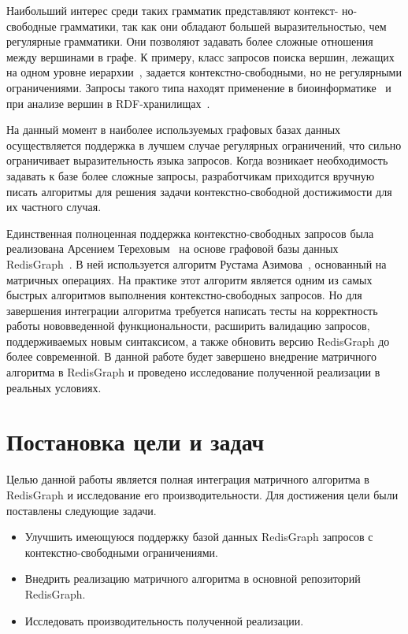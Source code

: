 \documentclass[14pt]{matmex-diploma-custom}
\begin{document}
Наибольший интерес среди таких грамматик представляют контекст-
но-свободные грамматики, так как они обладают большей выразительностью, чем регулярные грамматики. Они позволяют задавать более сложные отношения между вершинами в графе. К примеру, класс
запросов поиска вершин, лежащих на одном уровне иерархии~\cite{zhang2016contextfree}, задается
контекстно-свободными, но не регулярными ограничениями. Запросы такого типа находят
применение в биоинформатике~\cite{bioinf} и при анализе вершин в RDF-хранилищах~\cite{zhang2016contextfree}.

На данный момент в наиболее используемых графовых базах данных осуществляется
поддержка в лучшем случае регулярных ограничений, что сильно ограничивает
выразительность языка запросов. Когда возникает необходимость задавать к базе более сложные запросы, разработчикам приходится вручную писать алгоритмы для решения задачи контекстно-свободной достижимости для их частного случая.

Единственная полноценная поддержка контекстно-свободных запросов была реализована Арсением Тереховым~\cite{Arseniy-diploma} на основе графовой базы данных RedisGraph~\cite{RedisGraph}. В ней используется алгоритм Рустама Азимова~\cite{azimov-algo}, основанный на матричных операциях. На практике этот алгоритм является одним из самых быстрых алгоритмов выполнения контекстно-свободных запросов. Но для завершения интеграции алгоритма требуется написать тесты на корректность работы нововведенной функциональности, расширить валидацию запросов, поддерживаемых новым синтаксисом, а также обновить версию RedisGraph до более современной.
В данной работе будет завершено внедрение матричного алгоритма в RedisGraph и проведено исследование полученной реализации в реальных условиях.
 
\section{Постановка цели и задач}
Целью данной работы является полная интеграция матричного алгоритма в RedisGraph и исследование его производительности. Для достижения цели были поставлены следующие
задачи.
\begin{itemize}
    \item Улучшить имеющуюся поддержку базой данных RedisGraph запросов с контекстно-свободными ограничениями.
    \item Внедрить реализацию матричного алгоритма в основной репозиторий RedisGraph.
    \item Исследовать производительность полученной реализации. 
\end{itemize}
\end{document}
